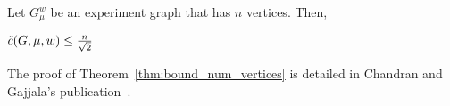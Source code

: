 \begin{theorem}
    \label{thm:bound_num_vertices}
    Let $G_\mu^w$ be an experiment graph that has $n$ vertices.
    Then,
    \begin{center}
        $\Tilde{c}(G, \mu, w) \leq \frac{n}{\sqrt{2}}$
    \end{center}
\end{theorem}

The proof of Theorem~\ref{thm:bound_num_vertices} is detailed in Chandran and Gajjala's publication~\cite{chandran2023graphtheoretic}.
